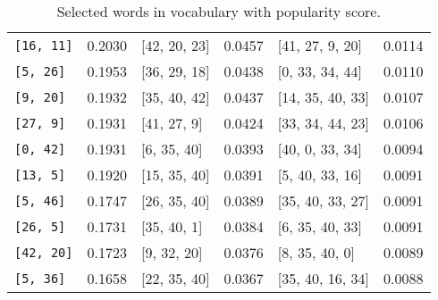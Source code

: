 \begin{table}[h]
\begin{tabular}{llllll}
\verb|[16, 11]| & 0.2030 & [42, 20, 23] & 0.0457 & [41, 27, 9, 20] & 0.0114 \\
\verb|[5, 26]| & 0.1953 & [36, 29, 18] & 0.0438 & [0, 33, 34, 44] & 0.0110 \\
\verb|[9, 20]| & 0.1932 & [35, 40, 42] & 0.0437 & [14, 35, 40, 33] & 0.0107 \\
\verb|[27, 9]| & 0.1931 & [41, 27, 9] & 0.0424 & [33, 34, 44, 23] & 0.0106 \\
\verb|[0, 42]| & 0.1931 & [6, 35, 40] & 0.0393 & [40, 0, 33, 34] & 0.0094 \\
\verb|[13, 5]| & 0.1920 & [15, 35, 40] & 0.0391 & [5, 40, 33, 16] & 0.0091 \\
\verb|[5, 46]| & 0.1747 & [26, 35, 40] & 0.0389 & [35, 40, 33, 27] & 0.0091 \\
\verb|[26, 5]| & 0.1731 & [35, 40, 1] & 0.0384 & [6, 35, 40, 33] & 0.0091 \\
\verb|[42, 20]| & 0.1723 & [9, 32, 20] & 0.0376 & [8, 35, 40, 0] & 0.0089 \\
\verb|[5, 36]| & 0.1658 & [22, 35, 40] & 0.0367 & [35, 40, 16, 34] & 0.0088 \\
\hline
\end{tabular}
\caption{Selected words in vocabulary with popularity score.}
\label{table:your_table_label}
\end{table}